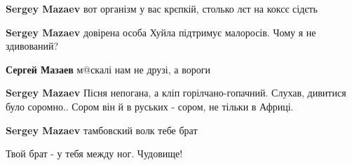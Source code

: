 \begin{itemize}
 
\textbf{Sergey Mazaev} вот організм у вас крєпкій, столько лєт на коксє сідєть

 
\textbf{Sergey Mazaev} довірена особа Хуйла підтримує малоросів. Чому я не здивований?

 
\textbf{Сергей Мазаев} м@скалі нам не друзі, а вороги

 
\textbf{Sergey Mazaev} Пісня непогана, а кліп горілчано-гопачний. Слухав, дивитися було соромно.. Сором він й в руських - сором, не тільки в Африці.

 
\textbf{Sergey Mazaev} тамбовский волк тебе брат

 
Твой брат - у тебя между ног. Чудовище!

 


\end{itemize}
